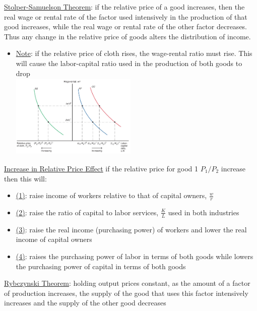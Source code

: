 \documentclass{article}
\begin{document}
\underline{Stolper-Samuelson Theorem}: if the relative price of a good increases, then the real wage or rental rate of the factor used intensively in the production of that good increases, while the real wage or rental rate of the other factor decreases. Thus any change in the relative price of goods alters the distribution of income.
\begin{itemize}
  \item  \underline{Note}: if the relative price of cloth rises, the wage-rental ratio must rise. This will cause the labor-capital ratio used in the production of both goods to drop \\
  \includegraphics[width=6cm, height=4cm]{pic3}
\end{itemize}
\underline{Increase in Relative Price Effect} if the relative price for good 1 $P_{1}/P_{2}$ increase then this will:
\begin{itemize}
  \item  \underline{(1)}: raise income of workers relative to that of capital owners, $\tfrac{w}{r}$
  \item  \underline{(2)}: raise the ratio of capital to labor services, $\tfrac{K}{L}$ used in both industries
  \item  \underline{(3)}: raise the real income (purchasing power) of workers and lower the real income of capital owners
  \item  \underline{(4)}: raises the purchasing power of labor in terms of both goods while lowers the purchasing power of capital in terms of both goods
\end{itemize}
\underline{Rybczynski Theorem}: holding output prices constant, as the amount of a factor of production increases, the supply of the good that uses this factor intensively increases and the supply of the other good decreases
\end{document}
